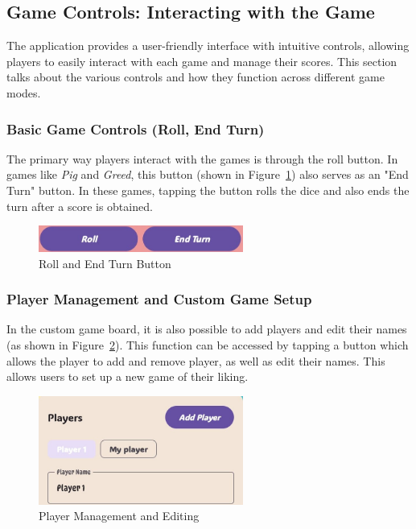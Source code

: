 \subsection{Game Controls: Interacting with the Game}

The application provides a user-friendly interface with intuitive controls, allowing players to easily interact with each game and manage their scores. This section talks about the various controls and how they function across different game modes.

\subsubsection{Basic Game Controls (Roll, End Turn)}

The primary way players interact with the games is through the roll button. In games like \textit{Pig} and \textit{Greed}, this button (shown in Figure~\ref{fig:control1}) also serves as an "End Turn" button. In these games, tapping the button rolls the dice and also ends the turn after a score is obtained.

\begin{figure}[ht!]
    \centering
    \includegraphics[width=0.6\textwidth]{img/control1.jpg}
    \caption{Roll and End Turn Button}
    \label{fig:control1}
\end{figure}

\subsubsection{Player Management and Custom Game Setup}

In the custom game board, it is also possible to add players and edit their names (as shown in Figure~\ref{fig:control2}). This function can be accessed by tapping a button which allows the player to add and remove player, as well as edit their names. This allows users to set up a new game of their liking.

\begin{figure}[ht!]
    \centering
    \includegraphics[width=0.6\textwidth]{img/control2.jpg}
    \caption{Player Management and Editing}
    \label{fig:control2}
\end{figure}

